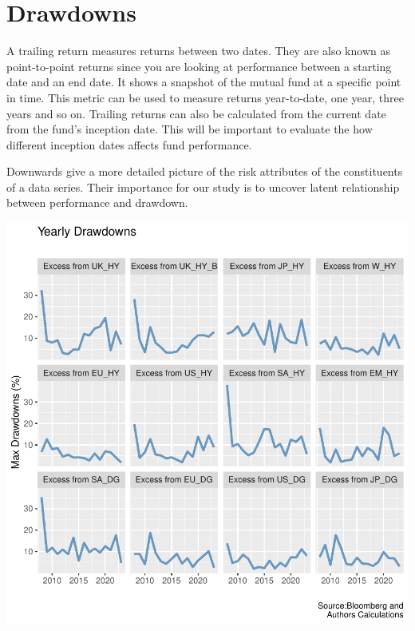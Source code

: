 \documentclass[11pt,preprint, authoryear]{elsarticle}
\let\origfigure\figure
\let\endorigfigure\endfigure
\renewenvironment{figure}[1][2] {
    \expandafter\origfigure\expandafter[H]
} {
    \endorigfigure
}
\numberwithin{equation}{section}
\numberwithin{figure}{section}
\numberwithin{table}{section}
\begin{document}
\hypertarget{drawdowns}{%
\section*{Drawdowns}\label{drawdowns}}

A trailing return measures returns between two dates. They are also
known as point-to-point returns since you are looking at performance
between a starting date and an end date. It shows a snapshot of the
mutual fund at a specific point in time. This metric can be used to
measure returns year-to-date, one year, three years and so on. Trailing
returns can also be calculated from the current date from the fund's
inception date. This will be important to evaluate the how different
inception dates affects fund performance.

Downwards give a more detailed picture of the risk attributes of the
constituents of a data series. Their importance for our study is to
uncover latent relationship between performance and drawdown.

\begin{figure}[H]

\includegraphics{ThesisWriteUp_files/figure-latex/Figure2-1} \hfill{}

\caption{Rolling 3 Year Returns \label{fig2}}\label{fig:Figure2}
\end{figure}
\end{document}
